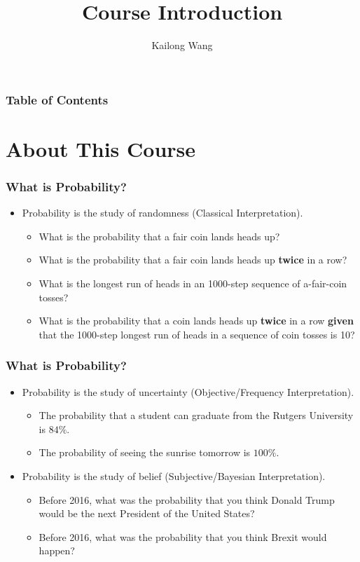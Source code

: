 \documentclass[11pt]{RU}
\title[14:332:226]{Course Introduction}
\author[Kai] %
{Kailong Wang\inst{1}
}
\institute[Rutgers] %
{
    \inst{1}%
    Rutgers University
}
\date[] %
{}
\theoremstyle{definition}
\theoremstyle{remark}
\begin{document}
\frame{\titlepage}
\begin{frame}
\frametitle{Table of Contents}
\tableofcontents
\end{frame}


\section{About This Course}
\begin{frame}
\frametitle{What is Probability?}
\begin{itemize}
    \item <1-> Probability is the study of randomness (\aka Classical Interpretation).
    \begin{itemize}
        \item <2-> What is the probability that a fair coin lands heads up?
        \item <3-> What is the probability that a fair coin lands heads up \textbf{twice} in a row?
        \item <4-> What is the longest run of heads in an 1000-step sequence of a-fair-coin tosses?
        \item <5-> What is the probability that a coin lands heads up \textbf{twice} in a row \textbf{given} that the 1000-step longest run of heads in a sequence of coin tosses is 10?
    \end{itemize}
\end{itemize}
\end{frame}

\begin{frame}
\frametitle{What is Probability?}
\begin{itemize}
    \item<1-> Probability is the study of uncertainty (\aka Objective/Frequency Interpretation).
    \begin{itemize}
        \item <2-> The probability that a student can graduate from the Rutgers University is $84\%$.
        \item <3-> The probability of seeing the sunrise tomorrow is $100\%$.
    \end{itemize}
    \item <4-> Probability is the study of belief (\aka Subjective/Bayesian Interpretation).
    \begin{itemize}
        \item <5-> Before 2016, what was the probability that you think Donald Trump would be the next President of the United States?
        \item <6-> Before 2016, what was the probability that you think Brexit would happen?
    \end{itemize}
\end{itemize}
\end{frame}
\end{document}
